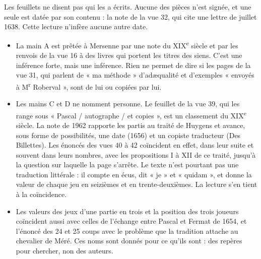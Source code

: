 \documentclass[11pt,a4paper]{article}
\begin{document}
Les feuillets ne disent pas qui les a écrits. Aucune des pièces n'est signée,
et une seule est datée par son contenu : la note de la vue 32, qui cite une
lettre de juillet 1638. Cette lecture n'infère aucune autre date.
\begin{itemize}
  \item La main A est prêtée à Mersenne par une note du XIX\textsuperscript{e}
    siècle et par les renvois de la vue 16 à des livres qui portent les titres
    des siens. C'est une inférence forte, mais une inférence. Rien ne permet
    de dire si les pages de la vue 31, qui parlent de « ma méthode »
    d'adæqualité et d'exemples « envoyés à M\textsuperscript{r} Roberval »,
    sont de lui ou copiées par lui.
  \item Les mains C et D ne nomment personne. Le feuillet de la vue 39, qui les
    range sous « Pascal / autographe / et copies », est un classement du
    XIX\textsuperscript{e} siècle. La note de 1962 rapporte les partis au
    traité de Huygens et avance, sous forme de possibilités, une date (1656) et
    un copiste traducteur (Des Billettes). Les énoncés des vues 40 à 42
    coïncident en effet, dans leur suite et souvent dans leurs nombres, avec les
    propositions I à XII de ce traité, jusqu'à la question sur laquelle la page
    s'arrête. Le texte n'est pourtant pas une traduction littérale : il
    compte en écus, dit « je » et « quidam », et donne la valeur de chaque jeu
    en seizièmes et en trente-deuxièmes. La lecture s'en tient à la
    coïncidence.
  \item Les valeurs des jeux d'une partie en trois et la position des trois
    joueurs coïncident aussi avec celles de l'échange entre Pascal et Fermat de
    1654, et l'énoncé des 24 et 25 coups avec le problème que la tradition
    attache au chevalier de Méré. Ces noms sont donnés pour ce qu'ils sont :
    des repères pour chercher, non des auteurs.
\end{itemize}
\end{document}
